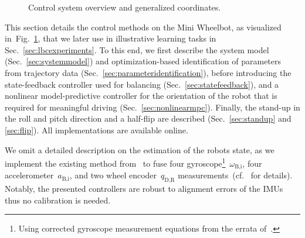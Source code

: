 
\begin{figure}[tb]
    \centering
    
    \caption{Control system overview and generalized coordinates.}
    \label{fig:controlsystem}
\end{figure}

This section details the control methods on the Mini Wheelbot, as visualized in~Fig.~\ref{fig:controlsystem}, that we later use in illustrative learning tasks in Sec.~\ref{sec:lbcexperiments}.
To this end, we first describe the system model (Sec.~\ref{sec:systemmodel}) and optimization-based identification of parameters from trajectory data (Sec.~\ref{sec:parameteridentification}), before introducing 
the state-feedback controller used for balancing (Sec.~\ref{sec:statefeedback}), and a nonlinear model-predictive controller for the orientation of the robot that is required for meaningful driving (Sec.~\ref{sec:nonlinearmpc}).
Finally, the stand-up in the roll and pitch direction and a half-flip are described (Sec.~\ref{sec:standup} and \ref{sec:flip}).
All implementations are available online\footnotemark[1].

We omit a detailed description on the estimation of the robots state, as we implement the existing method from~\cite{geist2022wheelbot} to fuse four gyroscope\footnote{Using corrected gyroscope measurement equations from the errata of~\cite{geist2022wheelbot}.}~$\omega_\text{B,i}$, four accelerometer~$a_\text{B,i}$, and two wheel encoder~$q_\text{D,R}$ measurements~(cf.~\cite{trimpe2010accelerometer,trimpe2012balancing,gajamohan2012cubli,muehlebach2016nonlinear} for details). Notably, the presented controllers are robust to alignment errors of the IMUs thus no calibration is needed.

